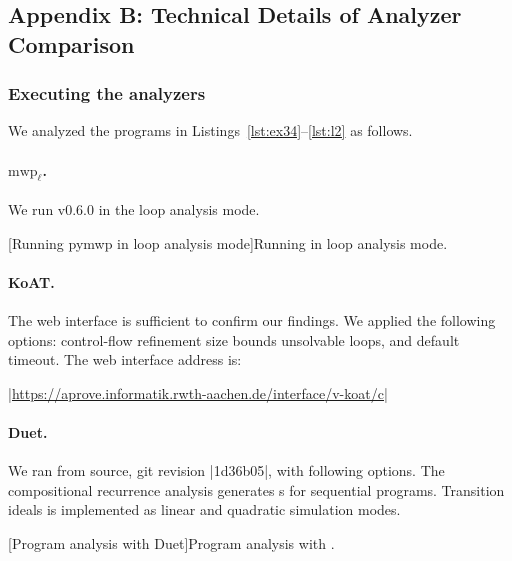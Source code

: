 \subsection{Appendix B: Technical Details of Analyzer Comparison}
\label{app:sec:comparison}

\subsubsection{Executing the analyzers}\label{subsec:analyzers}

We analyzed the programs in Listings~\ref{lst:ex34}--\ref{lst:l2} as follows.

\paragraph*{$\text{mwp}_\ell$.}
We run  v0.6.0 in the loop analysis mode.
\begin{center}
\begin{minipage}{\textwidth}
\captionsetup{type=lstlisting}
[Running pymwp in loop analysis mode]{Running  in loop analysis mode.}
\label{lst:mwp-bash}
\end{minipage}
\end{center}

\paragraph*{KoAT.}
The  web interface is sufficient to confirm our findings.
We applied the following options:
\myok{ }control-flow refinement
\myok{ }size bounds
\myok{ }unsolvable loops, and default timeout.
The web interface address is:

\begin{center}
\href{https://aprove.informatik.rwth-aachen.de/interface/v-koat/c}%
{\pr|https://aprove.informatik.rwth-aachen.de/interface/v-koat/c|}
\end{center}

\paragraph*{Duet.}
We ran  from source, git revision \pr|1d36b05|, with following options.
The compositional recurrence analysis generates s for sequential programs.
Transition ideals is implemented as linear and quadratic simulation modes.
\begin{center}
\begin{minipage}{\textwidth}
\captionsetup{type=lstlisting}
[Program analysis with Duet]{Program analysis with .}
\label{lst:duet-bash}
\end{minipage}
\end{center}

